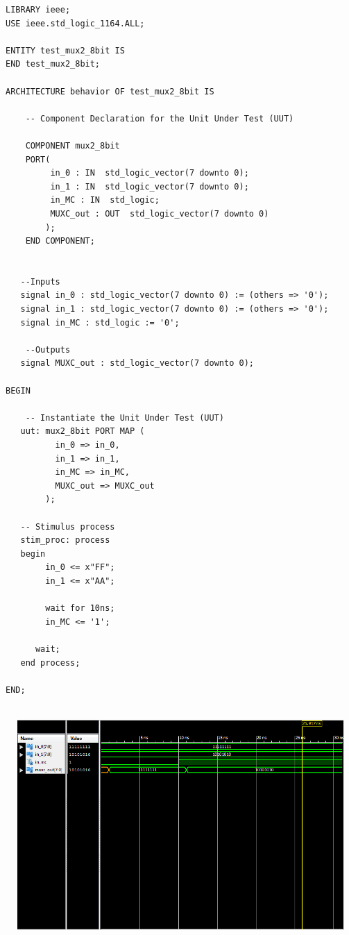 \documentclass{article}
\begin{document}
\begin{lstlisting}
LIBRARY ieee;
USE ieee.std_logic_1164.ALL;
 
ENTITY test_mux2_8bit IS
END test_mux2_8bit;
 
ARCHITECTURE behavior OF test_mux2_8bit IS 
 
    -- Component Declaration for the Unit Under Test (UUT)
 
    COMPONENT mux2_8bit
    PORT(
         in_0 : IN  std_logic_vector(7 downto 0);
         in_1 : IN  std_logic_vector(7 downto 0);
         in_MC : IN  std_logic;
         MUXC_out : OUT  std_logic_vector(7 downto 0)
        );
    END COMPONENT;
    

   --Inputs
   signal in_0 : std_logic_vector(7 downto 0) := (others => '0');
   signal in_1 : std_logic_vector(7 downto 0) := (others => '0');
   signal in_MC : std_logic := '0';

 	--Outputs
   signal MUXC_out : std_logic_vector(7 downto 0);

BEGIN
 
	-- Instantiate the Unit Under Test (UUT)
   uut: mux2_8bit PORT MAP (
          in_0 => in_0,
          in_1 => in_1,
          in_MC => in_MC,
          MUXC_out => MUXC_out
        );

   -- Stimulus process
   stim_proc: process
   begin		
		in_0 <= x"FF";
		in_1 <= x"AA";
		
		wait for 10ns;
		in_MC <= '1';
	
      wait;
   end process;

END;
   
\end{lstlisting}
\includegraphics[width=16cm, height=8cm]{test_mux2_8bit.png}
\pagebreak
\end{document}
